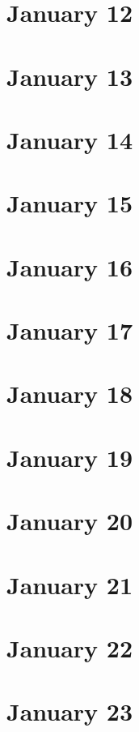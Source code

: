 \section{January 12}

\section{January 13}

\section{January 14}

\section{January 15}

\section{January 16}

\section{January 17}

\section{January 18}

\section{January 19}

\section{January 20}

\section{January 21}

\section{January 22}

\section{January 23}

